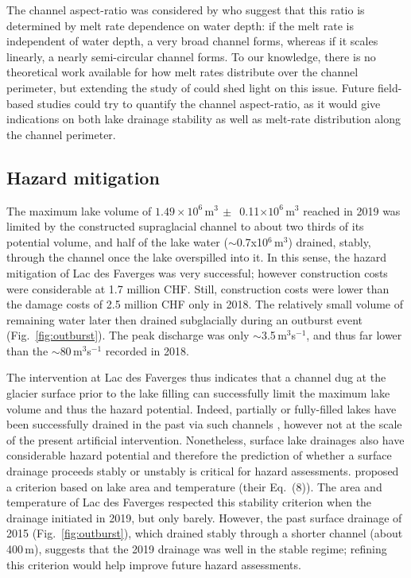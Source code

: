 The channel aspect-ratio was considered by \cite{Jarosch&Gudmundsson2012} who suggest that this ratio is determined by melt rate dependence on water depth: if the melt rate is independent of water depth, a very broad channel forms, whereas if it scales linearly, a nearly semi-circular channel forms. To our knowledge, there is no theoretical work available for how melt rates distribute over the channel perimeter, but extending the study of \cite{Sommers&Rajaram2020} could shed light on this issue. Future field-based studies could try to quantify the channel aspect-ratio, as it would give indications on both lake drainage stability as well as melt-rate distribution along the channel perimeter.


 \subsection{Hazard mitigation}

The maximum lake volume of $1.49\times10^6$\,m$^3\,\pm\,$ 0.11$\times10^6$\,m$^3$ reached in 2019 was limited by the constructed supraglacial channel to about two thirds of its potential volume, and half of the lake water ($\sim$0.7x10$^6$\,m$^3$) drained, stably, through the channel once the lake overspilled into it. In this sense, the hazard mitigation of Lac des Faverges was very successful; however construction costs were considerable at 1.7 million CHF. Still, construction costs were lower than the damage costs of 2.5 million CHF only in 2018.
The relatively small volume of remaining water later then drained subglacially during an outburst event (Fig.~\ref{fig:outburst}). The peak discharge was only $\sim$3.5\,m$^3$s$^{-1}$, and thus far lower than the $\sim$80\,m$^3$s$^{-1}$ recorded in 2018.

The intervention at Lac des Faverges thus indicates that a channel dug at the glacier surface prior to the lake filling can successfully limit the maximum lake volume and thus the hazard potential.  Indeed, partially or fully-filled lakes have been successfully drained in the past via such channels \citep[e.g.][]{Vincent&al2010}, however not at the scale of the present artificial intervention. Nonetheless, surface lake drainages also have considerable hazard potential \citep[e.g.][]{Walder&Costa1996,Ancey&al2019} and therefore the prediction of whether a surface drainage proceeds stably or unstably is critical for hazard assessments. \cite{Raymond&Nolan2000}
proposed a criterion based on lake area and temperature (their Eq.~(8)). The area and temperature of Lac des Faverges respected this stability criterion when the drainage initiated in 2019, but only barely.  However, the past surface drainage of 2015 (Fig.~\ref{fig:outburst}), which drained stably through a shorter channel (about 400\,m), suggests that the 2019 drainage was well in the stable regime; refining this criterion would help improve future hazard assessments.

